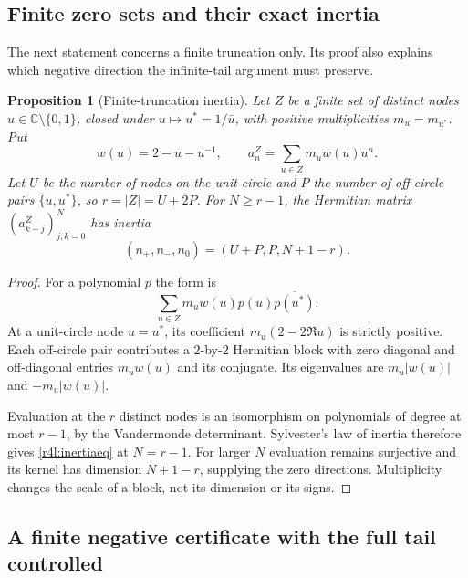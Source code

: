 \documentclass[11pt,a4paper]{article}
\newtheorem{proposition}[theorem]{Proposition}
\theoremstyle{definition}\newtheorem{definition}[theorem]{Definition}
\theoremstyle{remark}\newtheorem{remark}[theorem]{Remark}
\newcommand{\C}{\mathbb C}\newcommand{\N}{\mathbb N}
\numberwithin{equation}{section}
\begin{document}
\subsection{Finite zero sets and their exact inertia}

The next statement concerns a finite truncation only.  Its proof also
explains which negative direction the infinite-tail argument must
preserve.

\begin{proposition}[Finite-truncation inertia]\label{r4l:inertia}
Let $Z$ be a finite set of distinct nodes $u\in\C\setminus\{0,1\}$,
closed under $u\mapsto u^*=1/\bar u$, with positive multiplicities
$m_u=m_{u^*}$.  Put
\[
 w(u)=2-u-u^{-1},\qquad
 a_n^Z=\sum_{u\in Z}m_uw(u)u^n.
\]
Let $U$ be the number of nodes on the unit circle and $P$ the number
of off-circle pairs $\{u,u^*\}$, so $r=|Z|=U+2P$.  For $N\ge r-1$,
the Hermitian matrix $(a_{k-j}^Z)_{j,k=0}^N$ has inertia
\begin{equation}\label{r4l:inertiaeq}
 (n_+,n_-,n_0)=(U+P,P,N+1-r).
\end{equation}
\end{proposition}
\begin{proof}
For a polynomial $p$ the form is
\[
 \sum_{u\in Z}m_uw(u)p(u)\overline{p(u^*)}.
\]
At a unit-circle node $u=u^*$, its coefficient
$m_u(2-2\Re u)$ is strictly positive.  Each off-circle pair contributes
a $2$-by-$2$ Hermitian block with zero diagonal and off-diagonal
entries $m_uw(u)$ and its conjugate.  Its eigenvalues are
$m_u|w(u)|$ and $-m_u|w(u)|$.

Evaluation at the $r$ distinct nodes is an isomorphism on polynomials
of degree at most $r-1$, by the Vandermonde determinant.  Sylvester's
law of inertia therefore gives \eqref{r4l:inertiaeq} at $N=r-1$.
For larger $N$ evaluation remains surjective and its kernel has
dimension $N+1-r$, supplying the zero directions.  Multiplicity
changes the scale of a block, not its dimension or its signs.
\end{proof}

\subsection{A finite negative certificate with the full tail controlled}
\end{document}
